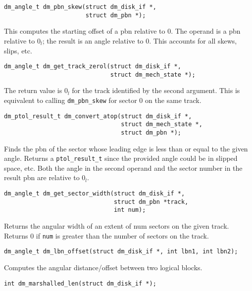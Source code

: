 \begin{verbatim}
dm_angle_t dm_pbn_skew(struct dm_disk_if *,
                       struct dm_pbn *);
\end{verbatim}

This computes the starting offset of a pbn relative to 0.  The operand
is a pbn relative to $0_l$; the result is an angle relative to $0$.
This accounts for all skews, slips, etc.

\begin{verbatim}
dm_angle_t dm_get_track_zerol(struct dm_disk_if *, 
                              struct dm_mech_state *);
\end{verbatim}

The return value is $0_l$ for the track identified by the second
argument.  This is equivalent to calling \texttt{dm\_pbn\_skew}
for sector 0 on the same track.


\begin{verbatim}
dm_ptol_result_t dm_convert_atop(struct dm_disk_if *,
                                 struct dm_mech_state *,
                                 struct dm_pbn *);
\end{verbatim}

Finds the pbn of the sector whose leading edge is less than or equal
to the given angle.  Returns a \texttt{ptol\_result\_t} since the
provided angle could be in slipped space, etc.  Both the angle in the
second operand and the sector number in the result pbn are relative to
$0_l$.



\begin{verbatim}
dm_angle_t dm_get_sector_width(struct dm_disk_if *,
                               struct dm_pbn *track,
                               int num);
\end{verbatim}

Returns the angular width of an extent of num sectors on the given track.
Returns 0 if \texttt{num} is greater than the number of sectors on the
track.

\begin{verbatim}
dm_angle_t dm_lbn_offset(struct dm_disk_if *, int lbn1, int lbn2);
\end{verbatim}

Computes the angular distance/offset between two logical blocks.


\begin{verbatim}
int dm_marshalled_len(struct dm_disk_if *);
\end{verbatim}

